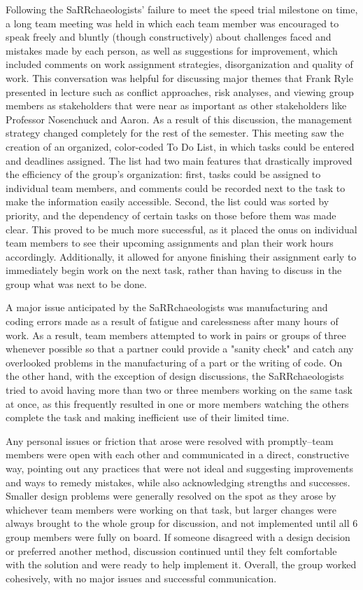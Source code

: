 Following the SaRRchaeologists' failure to meet the speed trial milestone on time, a long team meeting was held in which each team member was encouraged to speak freely and bluntly (though constructively) about challenges faced and mistakes made by each person, as well as suggestions for improvement, which included comments on work assignment strategies, disorganization and quality of work. This conversation was helpful for discussing major themes that Frank Ryle presented in lecture such as conflict approaches, risk analyses, and viewing group members as stakeholders that were near as important as other stakeholders like Professor Nosenchuck and Aaron. As a result of this discussion, the management strategy changed completely for the rest of the semester. This meeting saw the creation of an organized, color-coded To Do List, in which tasks could be entered and deadlines assigned. The list had two main features that drastically improved the efficiency of the group's organization: first, tasks could be assigned to individual team members, and comments could be recorded next to the task to make the information easily accessible. Second, the list could was sorted by priority, and the dependency of certain tasks on those before them was made clear. This proved to be much more successful, as it placed the onus on individual team members to see their upcoming assignments and plan their work hours accordingly. Additionally, it allowed for anyone finishing their assignment early to immediately begin work on the next task, rather than having to discuss in the group what was next to be done.


A major issue anticipated by the SaRRchaeologists was manufacturing and coding errors made as a result of fatigue and carelessness after many hours of work. As a result, team members attempted to work in pairs or groups of three whenever possible so that a partner could provide a "sanity check" and catch any overlooked problems in the manufacturing of a part or the writing of code. On the other hand, with the exception of design discussions, the SaRRchaeologists tried to avoid having more than two or three members working on the same task at once, as this frequently resulted in one or more members watching the others complete the task and making inefficient use of their limited time.

Any personal issues or friction that arose were resolved with promptly--team members were open with each other and communicated in a direct, constructive way, pointing out any practices that were not ideal and suggesting improvements and ways to remedy mistakes, while also acknowledging strengths and successes. Smaller design problems were generally resolved on the spot as they arose by whichever team members were working on that task, but larger changes were always brought to the whole group for discussion, and not implemented until all 6 group members were fully on board. If someone disagreed with a design decision or preferred another method, discussion continued until they felt comfortable with the solution and were ready to help implement it. Overall, the group worked cohesively, with no major issues and successful communication.

